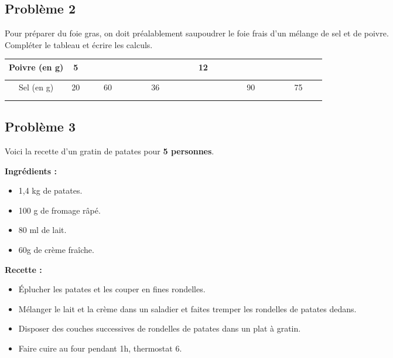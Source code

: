 \subsection*{Problème 2}

Pour préparer du foie gras, on doit préalablement saupoudrer le foie frais d'un mélange de sel et de poivre. \\
Compléter le tableau et écrire les calculs.

\begin{center}\begin{tabular}{|c|c|c|c|c|c|c|} \hline
  Poivre (en g) &  5 &  $\phantom{\dfrac{azertyuiop}{O}}$  &   $\phantom{\dfrac{azertyuiop}{O}}$ & 12 &  $\phantom{\dfrac{azertyuiop}{O}}$  &  $\phantom{\dfrac{azertyuiop}{O}}$  \\  \hline
  Sel (en g)    & 20 & 60 & 36 &  $\phantom{\dfrac{azertyuiop}{O}}$  & 90 & 75 \\  \hline
\end{tabular}\end{center}

\Pointilles[5] 

\subsection*{Problème 3}

Voici la recette d'un gratin de patates pour \textbf{5 personnes}. 

\begin{minipage}[t]{0.45\textwidth}
  \textbf{Ingrédients : }
  \begin{itemize}
    \item 1,4 kg de patates.
    \item 100 g de fromage râpé.
    \item 80 ml de lait.
    \item 60g de crème fraîche.
  \end{itemize}

\end{minipage}
\begin{minipage}[t]{0.5\textwidth}
  \textbf{Recette :}
  \begin{itemize}
    \item Éplucher les patates et les couper en fines rondelles.
    \item Mélanger le lait et la crème dans un saladier et faites tremper les rondelles de patates dedans.
    \item Disposer des couches successives de rondelles de patates dans un plat à gratin. 
    \item Faire cuire au four pendant 1h, thermostat 6.
  \end{itemize}
\end{minipage}

